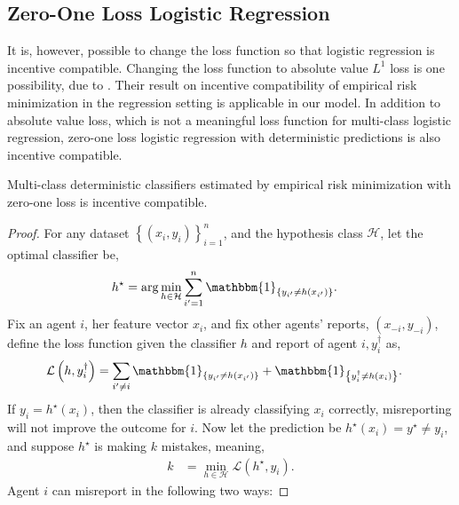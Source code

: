 \documentclass{article}
\begin{document}
\subsection{Zero-One Loss Logistic Regression}
It is, however, possible to change the loss function so that logistic regression is incentive compatible. Changing the loss function to absolute value $L^{1}$ loss is one possibility, due to \citet*{dekel2010incentive}. Their result on incentive compatibility of empirical risk minimization in the regression setting is applicable in our model. In addition to absolute value loss, which is not a meaningful loss function for multi-class logistic regression, zero-one loss logistic regression with deterministic predictions is also incentive compatible.
\newline \newline
\begin{prop} \label{prop:zolog} 
Multi-class deterministic classifiers estimated by empirical risk minimization with zero-one loss is incentive compatible.
\end{prop}
\begin{proof} \label{proof:zologpf} 
For any dataset $\left\{\left(x_{i}, y_{i}\right)\right\}_{i=1}^{n}$, and the hypothesis class $\mathcal{H}$, let the optimal classifier be,
\begin{align*}
h^\star  &= \arg\displaystyle\min_{h \in \mathcal{H}} \displaystyle\sum_{i'=1}^{n} \mathbbm{1}_{\left\{y_{i'} \neq  h\left(x_{i'}\right)\right\}}.
\end{align*}
Fix an agent $i $, her feature vector $x_{i}$, and fix other agents' reports, $\left(x_{-i}, y_{-i}\right)$, define the loss function given the classifier $h $ and report of agent $i , y^{\dagger}_{i}$ as,
\begin{align*}
\mathcal{L}\left(h, y^{\dagger}_{i}\right) &= \displaystyle\sum_{i' \neq  i} \mathbbm{1}_{\left\{y_{i'} \neq  h\left(x_{i'}\right)\right\}} + \mathbbm{1}_{\left\{y^{\dagger}_{i} \neq  h\left(x_{i}\right)\right\}}.
\end{align*}
If $y_{i} = h^\star \left(x_{i}\right)$, then the classifier is already classifying $x_{i}$ correctly, misreporting will not improve the outcome for $i $. Now let the prediction be $h^\star \left(x_{i}\right) = y^\star  \neq  y_{i}$, and suppose $h^\star $ is making $k $ mistakes, meaning,
\begin{align*}
k  &= \displaystyle\min_{h \in \mathcal{H}} \mathcal{L}\left(h^\star , y_{i}\right).
\end{align*}
Agent $i $ can misreport in the following two ways:
\end{proof}
\end{document}
